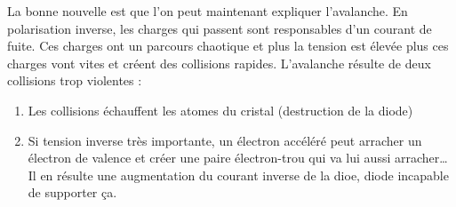 	La bonne nouvelle est que l'on peut maintenant expliquer l'avalanche. En polarisation 
	inverse, les charges qui passent sont responsables d'un courant de fuite. Ces charges 
	ont un parcours chaotique et plus la tension est élevée plus ces charges vont vites 
	et créent des collisions rapides. L'avalanche résulte de deux collisions trop violentes :
	\begin{enumerate}
	\item Les collisions échauffent les atomes du cristal (destruction de la diode)
	\item Si tension inverse très importante, un électron accéléré peut arracher un 
	électron de valence et créer une paire électron-trou qui va lui aussi arracher\dots
	Il en résulte une augmentation du courant inverse de la dioe, diode incapable de 
	supporter ça.
	\end{enumerate}

















	
	

